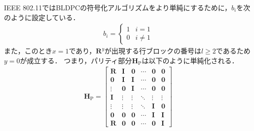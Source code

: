 \documentclass[twocolumn, a4paper]{ieicejsp}
\begin{document}
IEEE 802.11ではBLDPCの符号化アルゴリズムをより単純にするために，$b_i$を次のように設定している．
\begin{align}
  b_i = \begin{cases}
    1 & i = 1 \\
    0 & i \not=1
  \end{cases}
\end{align}
また，このとき$x=1$であり，$\mathbf{R}^y$が出現する行ブロックの番号は$l \geq 2$であるため$y=0$が成立する．
つまり，パリティ部分$\mathbf{H}_\mathrm{P}$は以下のように単純化される．
\begin{align}
  \mathbf{H}_{\mathrm{P}} = \begin{bmatrix}
    \mathbf{R} & \mathbf{I} & \mathbf{0} & \cdots & \mathbf{0} & \mathbf{0} \\
    \mathbf{0} & \mathbf{I} & \mathbf{I} & \cdots & \mathbf{0} & \mathbf{0} \\
    \vdots & \mathbf{0} & \mathbf{I} & \cdots & \mathbf{0} & \mathbf{0} \\
    \mathbf{I} & \vdots & \vdots & \ddots & \vdots & \vdots \\
    \vdots & \vdots & \vdots & \ddots & \mathbf{I} & \mathbf{0} \\
    \mathbf{0} & \mathbf{0} & \mathbf{0} & \cdots & \mathbf{I} & \mathbf{I} \\
    \mathbf{R} & \mathbf{0} & \mathbf{0} & \cdots & \mathbf{0} & \mathbf{I}
  \end{bmatrix}
\end{align}
\end{document}
